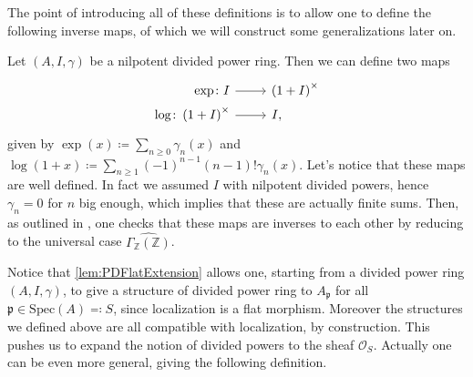\noindent
The point of introducing all of these definitions is to allow one to define the following
inverse maps, of which we will construct some generalizations later on.
\begin{defn}[]\label{defn:PDExponential}
	Let $\left(A, I, \gamma\right)$ be a nilpotent divided power ring.
	Then we can define two maps
	\begin{equation*}
	\begin{tikzcd}[row sep = 0ex
		,/tikz/column 1/.append style={anchor=base east}
		,/tikz/column 2/.append style={anchor=base west}]
		\exp\colon I \arrow[r, "", rightarrow] &
		\left( 1 + I \right)^{\times}\\
		\log\colon \left( 1 + I \right)^{\times} \arrow[r, "", rightarrow] &
		I
	,\end{tikzcd}
	\end{equation*} 
	given by 
	$\exp (x) \coloneqq \sum_{n\geq 0} \gamma_n(x)$
	and $\log (1+x) \coloneqq \sum_{n\geq 1} 
	(-1)^{n-1} \left( n-1 \right)! \gamma_n(x)$.
	Let's notice that these maps are well defined.
	In fact we assumed $I$ with nilpotent divided powers,
	hence $\gamma_n = 0$ for $n$ big enough, which implies that
	these are actually finite sums.
	Then, as outlined in \cite[Chapter III, \S1.6]{Messing},
	one checks that these maps are inverses to each other
	by reducing to the universal case $\widehat{\Gamma_{\mathbb{Z}}(\mathbb{Z})}$.
\end{defn}


\begin{rem}[]
	Notice that \cref{lem:PDFlatExtension} allows one, starting from
	a divided power ring $\left(A, I, \gamma\right)$, to give
	a structure of divided power ring to $A_{\mathfrak{p}}$ for all
	$\mathfrak{p} \in \mathrm{Spec}(A) \eqqcolon S$, since localization is a flat morphism.
	Moreover the structures we defined above are all compatible with localization, by construction.
	This pushes us to expand the notion of divided powers to the
	sheaf $\mathcal{O}_{ S }$.
	Actually one can be even more general, giving the following definition.
\end{rem}


